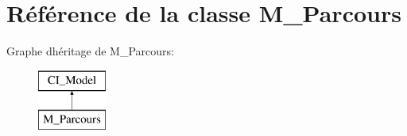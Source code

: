 \hypertarget{class_m___parcours}{}\section{Référence de la classe M\+\_\+\+Parcours}
\label{class_m___parcours}
Graphe d\textquotesingle{}héritage de M\+\_\+\+Parcours\+:\begin{figure}[H]
\begin{center}
\leavevmode
\includegraphics[height=2.000000cm]{class_m___parcours}
\end{center}
\end{figure}
